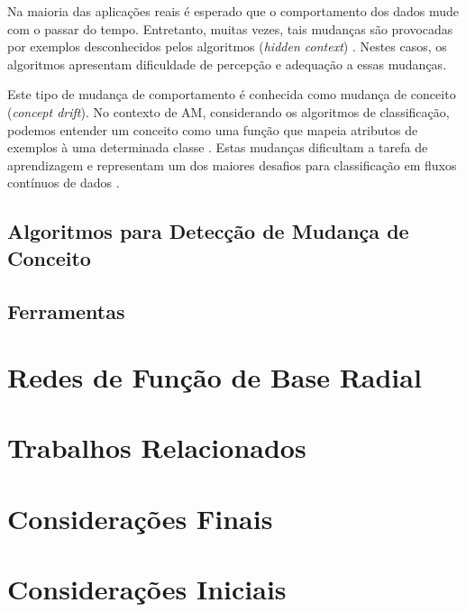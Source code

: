 \documentclass[qual, classic, a4paper]{ufbathesis}
\begin{document}
Na maioria das aplicações reais é esperado que o comportamento dos dados mude com o passar do tempo.
Entretanto, muitas vezes, tais mudanças são provocadas por exemplos desconhecidos pelos algoritmos (\textit{hidden context}) \cite{Gama:2014:SCD:2597757.2523813}.
Nestes casos, os algoritmos apresentam dificuldade de percepção e adequação a essas mudanças.

Este tipo de mudança de comportamento é conhecida como mudança de conceito (\textit{concept drift}).
No contexto de AM, considerando os algoritmos de classificação, podemos entender um conceito como uma função que mapeia atributos de exemplos à uma determinada classe \cite{Aggarwal:2004:DCD:1014052.1014110}.
Estas mudanças dificultam a tarefa de aprendizagem \cite{Gama:2014:SCD:2597757.2523813} e representam um dos maiores desafios para classificação em fluxos contínuos de dados \cite{Gholipour:2013:ART:2480362.2480519}.





\subsection{Algoritmos para Detecção de Mudança de Conceito}
\blindtext

\subsection{Ferramentas}
\blindtext

\section{Redes de Função de Base Radial}
\blindtext
  
\section{Trabalhos Relacionados}
\blindtext

\section{Considerações Finais}
\blindtext

 \label{plano_pesquisa}
\section{Considerações Iniciais}
\blindtext
\end{document}
